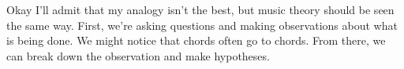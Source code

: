 \documentclass[../OpenAppliedMusicTheory.tex]{subfiles}
\begin{document}
    Okay I'll admit that my analogy isn't the best, but music theory should be seen the same way. First, we're asking questions and making observations about what is being done. We might notice that  chords often go to  chords. From there, we can break down the observation and make hypotheses. 
\end{document}
